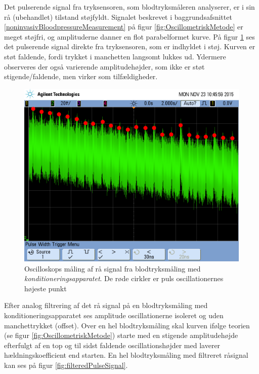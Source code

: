 Det pulserende signal fra tryksensoren, som blodtryksmåleren analyserer, er i sin rå (ubehandlet) tilstand støjfyldt. Signalet beskrevet i baggrundsafsnittet \ref{noninvasivBloodpressureMeasurement} på figur \ref{fig:OscillometriskMetode} er meget støjfri, og amplituderne danner en flot parabelformet kurve. På figur \ref{fig:rawPulseSignal} ses det pulserende signal direkte fra tryksensoren, som er indhyldet i støj. Kurven er støt faldende, fordi trykket i manchetten langsomt lukkes ud. Ydermere observeres der også varierende amplitudehøjder, som ikke er støt stigende/faldende, men virker som tilfældigheder.  

\begin{figure}[H]
	\centering
	\includegraphics[trim={0 7cm 0 1.5cm},clip, width=1\textwidth]{billeder/rawPulseSignalPeaks.png}
	\caption{Oscilloskops måling af rå signal fra blodtryksmåling med \textit{konditioneringsapparatet}. De røde cirkler er puls oscillationernes højeste punkt}\label{fig:rawPulseSignal}
\end{figure}

Efter analog filtrering af det rå signal på en blodtryksmåling med konditioneringsapparatet ses amplitude oscillationerne isoleret og uden manchettrykket (offset). Over en hel blodtryksmåling skal kurven ifølge teorien (se figur \ref{fig:OscillometriskMetode}) starte med en stigende amplitudehøjde efterfulgt af en top og til sidst faldende oscillationshøjder med laverer hældningskoefficient end starten. En hel blodtryksmåling med filtreret råsignal kan ses på figur \ref{fig:filteredPulseSignal}.


